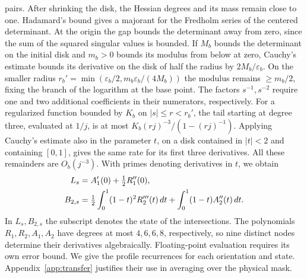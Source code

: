 pairs. After shrinking the disk, the Hessian degrees and its mass remain close to one. Hadamard's bound
gives a majorant for the Fredholm series of the centered determinant. At the origin the gap bounds the
determinant away from zero, since the sum of the squared singular values is bounded. If \(M_b\) bounds
the determinant on the initial disk and \(m_b>0\) bounds its modulus from below at zero, Cauchy's
estimate bounds its derivative on the disk of half the radius by \(2M_b/\varepsilon_b\). On the smaller
radius \(r_b'=\min(\varepsilon_b/2,m_b\varepsilon_b/(4M_b))\) the modulus remains \(\ge m_b/2\), fixing
the branch of the logarithm at the base point. The factors \(s^{-1},s^{-2}\) require one and two
additional coefficients in their numerators, respectively. For a regularized function bounded by \(K_b\)
on \(|s|\le r<r_b'\), the tail starting at degree three, evaluated at \(1/j\), is at most
\(K_b(rj)^{-3}/(1-(rj)^{-1})\). Applying Cauchy's estimate also in the parameter \(t\), on a disk
contained in \(|t|<2\) and containing \([0,1]\), gives the same rate for its first three derivatives. All
these remainders are \(O_b(j^{-3})\). With primes denoting derivatives in \(t\), we obtain \begin{align}
 L_s&=A'_1(0)+\tfrac12R''_1(0),\notag\\
 B_{2,s}&=\tfrac12\int_0^1(1-t)^2R'''_2(t)\,dt+\int_0^1(1-t)A''_2(t)\,dt .\label{eq:estado-def}
\end{align} In \(L_s,B_{2,s}\) the subscript denotes the state of the intersections. The polynomials
\(R_1,R_2,A_1,A_2\) have degrees at most \(4,6,6,8\), respectively, so nine distinct nodes determine
their derivatives algebraically. Floating-point evaluation requires its own error bound. We give the
profile recurrences for each orientation and state. Appendix~\ref{app:transfer} justifies their use in
averaging over the physical mask.

 
